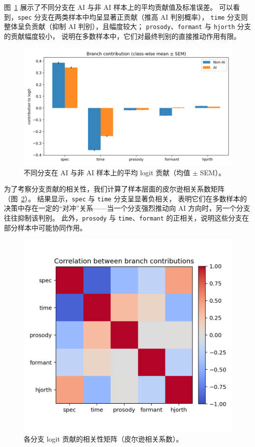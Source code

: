 \documentclass[a4paper,12pt]{article}
\begin{document}
图~\ref{fig:contrib_means} 展示了不同分支在 AI 与非 AI 样本上的平均贡献值及标准误差。
可以看到，\texttt{spec} 分支在两类样本中均呈显著正贡献（推高 AI 判别概率），
\texttt{time} 分支则整体呈负贡献（抑制 AI 判别），且幅度较大；
\texttt{prosody}、\texttt{formant} 与 \texttt{hjorth} 分支的贡献幅度较小，
说明在多数样本中，它们对最终判别的直接推动作用有限。

\begin{figure}[H]
  \centering
  \includegraphics[width=.75\linewidth]{images_in_paper/contrib_means_by_class.png}
  \caption{不同分支在 AI 与非 AI 样本上的平均 logit 贡献（均值 $\pm$ SEM）。}
  \label{fig:contrib_means}
\end{figure}

为了考察分支贡献的相关性，我们计算了样本层面的皮尔逊相关系数矩阵（图~\ref{fig:contrib_corr}）。
结果显示，\texttt{spec} 与 \texttt{time} 分支呈显著负相关，
表明它们在多数样本的决策中存在一定的“对冲”关系——当一个分支强烈推动向 AI 方向时，另一个分支往往抑制该判别。
此外，\texttt{prosody} 与 \texttt{time}、\texttt{formant} 的正相关，说明这些分支在部分样本中可能协同作用。

\begin{figure}[H]
  \centering
  \includegraphics[width=.5\linewidth]{images_in_paper/contrib_correlation.png}
  \caption{各分支 logit 贡献的相关性矩阵（皮尔逊相关系数）。}
  \label{fig:contrib_corr}
\end{figure}
\end{document}
